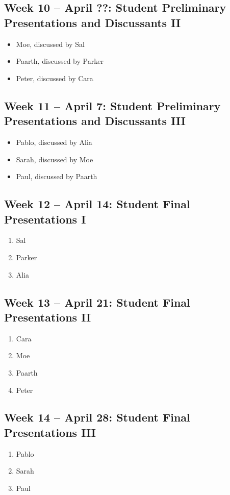 \documentclass[11pt]{article}
\begin{document}
\subsection*{Week 10 -- April ??: Student Preliminary Presentations and Discussants II}
\begin{itemize}
    \setlength{\itemsep}{0em}
    \item Moe, discussed by Sal
    \item Paarth, discussed by Parker
    \item Peter, discussed by Cara
\end{itemize}

\subsection*{Week 11 -- April 7: Student Preliminary Presentations and Discussants III}
\begin{itemize}
    \setlength{\itemsep}{0em}
    \item Pablo, discussed by Alia
    \item Sarah, discussed by Moe
    \item Paul, discussed by Paarth
\end{itemize}

\subsection*{Week 12 -- April 14: Student Final Presentations I}
\begin{enumerate}
    \setlength{\itemsep}{0em}
    \item Sal
    \item Parker
    \item Alia
\end{enumerate}

\subsection*{Week 13 -- April 21: Student Final Presentations II}
\begin{enumerate}
    \item Cara
    \item Moe
    \item Paarth
    \item Peter
\end{enumerate}
\vspace{1em}

\subsection*{Week 14 -- April 28: Student Final Presentations III}
\begin{enumerate}
    \item Pablo
    \item Sarah
    \item Paul
\end{enumerate}
\end{document}
